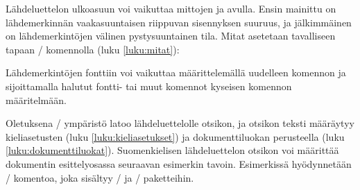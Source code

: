 
Lähdeluettelon ulkoasuun voi vaikuttaa mittojen  ja
 avulla. Ensin mainittu on lähdemerkinnän vaakasuuntaisen
riippuvan sisennyksen suuruus, ja jälkimmäinen on lähdemerkintöjen
välinen pystysuuntainen tila. Mitat asetetaan tavalliseen tapaan
\-/ komennolla (luku \ref{luku:mitat}):

\begin{koodilohkosis}
\setlength{\parindent}{1.1em} %
\setlength{\bibhang}{\parindent}
\setlength{\bibsep}{.5ex plus .1ex minus .1ex}
\end{koodilohkosis}

Lähdemerkintöjen fonttiin voi vaikuttaa määrittelemällä uudelleen
komennon  ja sijoittamalla halutut fontti- tai muut
komennot kyseisen komennon määritelmään.

\begin{koodilohkosis}
\renewcommand{\bibfont}{\sffamily\small}
\end{koodilohkosis}

Oletuksena \-/ ympäristö latoo
lähdeluettelolle otsikon, ja otsikon teksti määräytyy kieliasetusten
(luku \ref{luku:kieliasetukset}) ja dokumenttiluokan perusteella (luku
\ref{luku:dokumenttiluokat}). Suomenkielisen lähdeluettelon otsikon voi
määrittää dokumentin esittelyosassa seuraavan esimerkin tavoin.
Esimerkissä hyödynnetään \-/ komentoa, joka sisältyy
\-/{} ja \-/ paketteihin.

